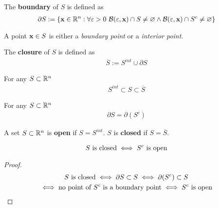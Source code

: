 \documentclass[11pt]{article}
\begin{document}
			\begin{definition}
				The \textbf{boundary} of $S$ is defined as
				\begin{gather}
					\partial S := \{\textbf{x} \in \mathbb{R}^n: \forall \varepsilon > 0\ \mathcal{{B}}(\varepsilon, \textbf{x}) \cap S \neq \varnothing \land \mathcal{{B}}(\varepsilon, \textbf{x}) \cap S^c \neq \varnothing \}
				\end{gather}
			\end{definition}
			
			\begin{theorem}
				A point $\textbf{x} \in S$ is either a \emph{boundary point} or a \emph{interior point}.
			\end{theorem}
			
			\begin{definition}
				The \textbf{closure} of $S$ is defined as 
				\begin{gather}
					\overline{S} := S^{int} \cup \partial S
				\end{gather}
			\end{definition}
			
			\begin{theorem}
				For any $S \subset \mathbb{R}^n$
				\begin{gather}
					S^{int} \subset S \subset \overline{S}
				\end{gather}
			\end{theorem}
			
			\begin{theorem}
				For any $S \subset \mathbb{R}^n$
				\begin{gather}
					\partial S = \partial (S^c)
				\end{gather}
			\end{theorem}
			
			\begin{definition}
				A set $S \subset \mathbb{R}^n$ is \textbf{open} if $S = S^{int}$. $S$ is \textbf{closed} if $S = \overline{S}$.
			\end{definition}
			
			\begin{theorem}
				\begin{gather}
					S \text{{ is closed}} \iff S^c \text{{ is open}}
				\end{gather}
				\begin{proof}
					\begin{gather}
						S \text{{ is closed}} \iff \partial S \subset S
						\iff \partial (S^c) \subset S \\
						\iff \text{{no point of $S^c$ is a boundary point}}
						\iff S^c \text{{ is open}}
					\end{gather}
				\end{proof}
			\end{theorem}
		
\end{document}
